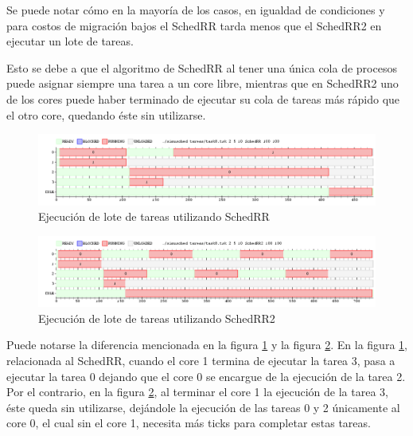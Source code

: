 \documentclass[a4paper,10pt,twoside]{article}
\begin{document}
Se puede notar cómo en la mayoría de los casos, en igualdad de condiciones y para costos de migración bajos el SchedRR tarda menos que el SchedRR2 en ejecutar un lote de tareas.

Esto se debe a que el algoritmo de SchedRR al tener una única cola de procesos puede asignar siempre una tarea a un core libre, mientras que en SchedRR2 uno de los cores puede haber terminado de ejecutar su cola de tareas más rápido que el otro core, quedando éste sin utilizarse.

\begin{figure}[ht!]
\centering
\includegraphics[width=175mm]{../ejercicio8/schedRRej8.png}
\caption{Ejecución de lote de tareas utilizando SchedRR}
\label{schedRRej8}
\end{figure}

\begin{figure}[ht!]
\centering
\includegraphics[width=175mm]{../ejercicio8/schedRR2ej8.png}
\caption{Ejecución de lote de tareas utilizando SchedRR2}
\label{schedRR2ej8}
\end{figure}

Puede notarse la diferencia mencionada en la figura \ref{schedRRej8} y la figura \ref{schedRR2ej8}. En la figura \ref{schedRRej8}, relacionada al SchedRR, cuando el core 1 termina de ejecutar la tarea 3, pasa a ejecutar la tarea 0 dejando que el core 0 se encargue de la ejecución de la tarea 2. Por el contrario, en la figura \ref{schedRR2ej8}, al terminar el core 1 la ejecución de la tarea 3, éste queda sin utilizarse, dejándole la ejecución de las tareas 0 y 2 únicamente al core 0, el cual sin el core 1, necesita más ticks para completar estas tareas.

\end{document}
